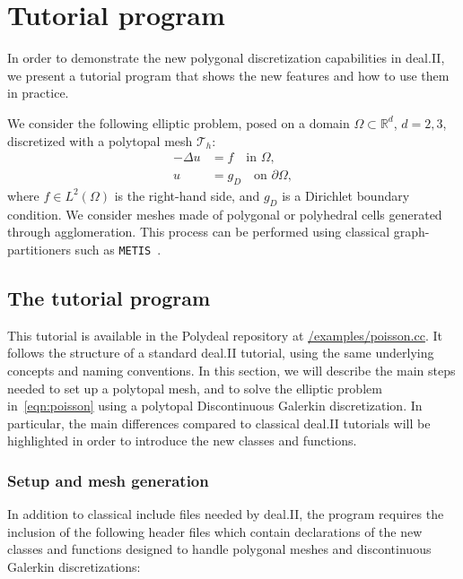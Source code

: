 \documentclass[a4paper,12pt]{article}
\begin{document}
\section{{Tutorial program }}
\label{sec:polydeal}
In order to demonstrate the new polygonal discretization capabilities in deal.II, we present
a tutorial program that shows the new features and how to use them in practice.



We consider the following elliptic problem, posed on a domain $\Omega \subset \mathbb{R}^d$, $d=2,3$, discretized with
a polytopal mesh $\mathcal{T}_h$:
\begin{equation}\label{eqn:poisson}
    \begin{aligned}
        -\Delta u & = f \quad \text{in } \Omega,            \\
        u         & = g_D \quad \text{on } \partial \Omega,
    \end{aligned}
\end{equation}
where $f \in L^2(\Omega)$ is the right-hand side, and $g_D$ is a Dirichlet
boundary condition. We consider meshes made of polygonal or polyhedral cells generated through agglomeration. This process
can be performed using classical graph-partitioners such as \texttt{METIS}~\cite{METIS}.


\subsection{The tutorial program}

This tutorial is available in the Polydeal repository at \href{https://github.com/fdrmrc/Polydeal/blob/main/examples/poisson.cc}{/examples/poisson.cc}. It follows the structure of a standard deal.II tutorial, using the same underlying concepts and naming conventions. In this section, we will describe the main steps needed to set up a polytopal mesh, and to solve
the elliptic problem in~\eqref{eqn:poisson} using a polytopal Discontinuous Galerkin discretization. In particular, the main differences compared to
classical deal.II tutorials will be highlighted in order to introduce the new classes and functions.


\subsubsection{Setup and mesh generation}
In addition to classical include files needed by deal.II, the program requires the inclusion of the following header files
which contain declarations of the new classes and functions designed to handle polygonal meshes and discontinuous Galerkin
discretizations:
\end{document}
